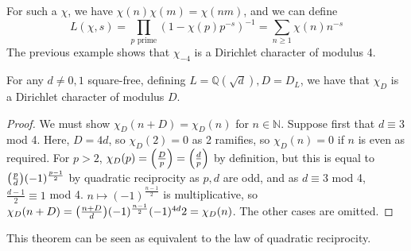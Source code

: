 For such a \( \chi \), we have \( \chi(n)\chi(m) = \chi(nm) \), and we can define
\[ L(\chi,s) = \prod_{p \text{ prime}}(1 - \chi(p)p^{-s})^{-1} = \sum_{n \geq 1}\chi(n)n^{-s} \]
The previous example shows that \( \chi_{-4} \) is a Dirichlet character of modulus 4.
\begin{theorem}
    For any \( d \neq 0, 1 \) square-free, defining \( L = \mathbb Q(\sqrt{d}), D = D_L \), we have that \( \chi_D \) is a Dirichlet character of modulus \( D \).
\end{theorem}
\begin{proof}
    We must show \( \chi_D(n+D) = \chi_D(n) \) for \( n \in \mathbb N \).
    Suppose first that \( d \equiv 3 \) mod 4.
    Here, \( D = 4d \), so \( \chi_D(2) = 0 \) as 2 ramifies, so \( \chi_D(n) = 0 \) if \( n \) is even as required.
    For \( p > 2 \), \( \chi_D(p) = \qty(\frac{D}{p}) = \qty(\frac{d}{p}) \) by definition, but this is equal to \( \qty(\frac{p}{d}) (-1)^{\frac{p-1}{2}} \) by quadratic reciprocity as \( p, d \) are odd, and as \( d \equiv 3 \) mod 4, \( \frac{d-1}{2} \equiv 1 \) mod 4.
    \( n \mapsto (-1)^{\frac{n-1}{2}} \) is multiplicative, so \( \chi_D(n+D) = \qty(\frac{n+D}{d})(-1)^{\frac{n-1}{2}}(-1)^{4d}{2} = \chi_D(n) \).
    The other cases are omitted.
\end{proof}
This theorem can be seen as equivalent to the law of quadratic reciprocity.
